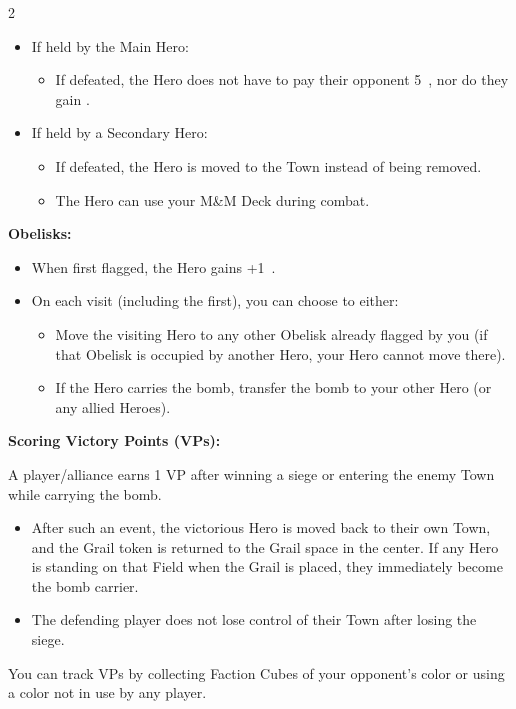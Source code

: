 \begin{multicols}{2}
\begin{itemize}
  \item If held by the Main Hero:
  \begin{itemize}
    \item If defeated, the Hero does not have to pay their opponent 5~, nor do they gain .
  \end{itemize}

  \item If held by a Secondary Hero:
  \begin{itemize}
    \item If defeated, the Hero is moved to the Town instead of being removed.
    \item The Hero can use your M\&M Deck during combat.
  \end{itemize}
\end{itemize}

\textbf{Obelisks:}

\begin{itemize}
  \item When first flagged, the Hero gains +1~.
  \item On each visit (including the first), you can choose to either:
  \begin{itemize}
    \item Move the visiting Hero to any other Obelisk already flagged by you (if that Obelisk is occupied by another Hero, your Hero cannot move there).
    \item If the Hero carries the bomb, transfer the bomb to your other Hero (or any allied Heroes).
  \end{itemize}
\end{itemize}

\textbf{Scoring Victory Points (VPs):}

A player/alliance earns 1 VP after winning a siege or entering the enemy Town while carrying the bomb.
\begin{itemize}
  \item After such an event, the victorious Hero is moved back to their own Town, and the Grail token is returned to the Grail space in the center. If any Hero is standing on that Field when the Grail is placed, they immediately become the bomb carrier.
  \item The defending player does not lose control of their Town after losing the siege.
\end{itemize}

You can track VPs by collecting Faction Cubes of your opponent's color or using a color not in use by any player.

\end{multicols}

